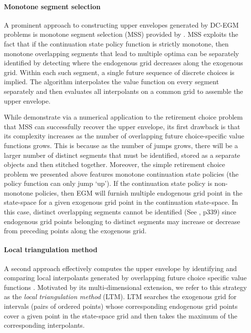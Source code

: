 \documentclass[12pt]{article}
\begin{document}
\paragraph{Monotone segment selection} A prominent approach to constructing upper envelopes generated by DC-EGM problems is monotone segment selection (MSS) provided by \citet{Iskhakov2017}. MSS exploits the fact that if the continuation state policy function is strictly monotone, then monotone overlapping segments that lead to multiple optima can be separately identified by detecting where the endogenous grid decreases along the exogenous grid. Within each such segment, a single future sequence of discrete choices is implied. The algorithm interpolates
the value function on every segment separately and then evaluates all interpolants on a common grid to assemble the upper envelope. 

While \cite{Iskhakov2017} demonstrate via a numerical application to the retirement choice problem that MSS can successfully recover the upper envelope,  its first drawback is that its complexity increases as the number of overlapping future choice-specific value functions grows. This is because as the number of jumps grows, there will be a larger number of distinct segments that must be identified, stored as a separate objects and then stitched together. Moreover, the simple retirement choice problem we presented above features monotone continuation state policies (the policy function can only jump `up'). If the continuation state policy is non-monotone policies, then EGM will furnish multiple endogenous grid point in the state-space for a given exogenous grid point in the continuation state-space. In this case, distinct overlapping segments cannot be identified (See \cite{Iskhakov2017}, p339) since endogenous grid points belonging to distinct segments may increase or decrease from preceding points along the exogenous grid.

\paragraph{Local triangulation method} A second approach effectively computes the upper envelope by identifying and comparing local interpolants generated by overlapping future choice specific value functions \citep{Druedahl2017,Druedahl2021}.  Motivated by its
multi-dimensional extension, we refer to this strategy as the \textit{local
triangulation method} (LTM).  LTM searches the exogenous grid for intervals (pairs of ordered points) whose corresponding endogenous grid points cover a given point in the state-space grid and then takes the maximum of the corresponding interpolants. 
\end{document}
